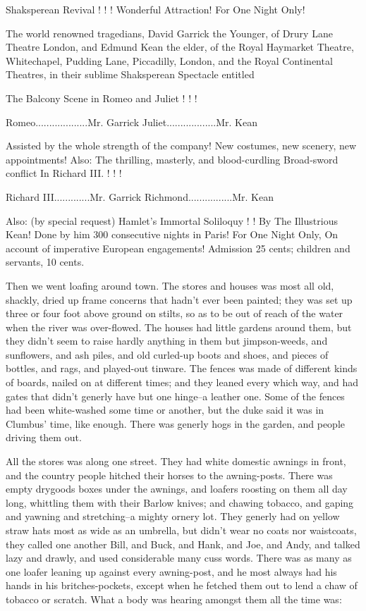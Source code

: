 Shaksperean Revival ! ! !
Wonderful Attraction!
For One Night Only!

The world renowned tragedians, David Garrick the Younger, of Drury Lane
Theatre London, and Edmund Kean the elder, of the Royal Haymarket
Theatre, Whitechapel, Pudding Lane, Piccadilly, London, and the Royal
Continental Theatres, in their sublime Shaksperean Spectacle entitled

The Balcony Scene in Romeo and Juliet ! ! !

Romeo...................Mr. Garrick
Juliet..................Mr. Kean

Assisted by the whole strength of the company!
New costumes, new scenery, new appointments!
Also: The thrilling, masterly, and blood-curdling
Broad-sword conflict In Richard III. ! ! !

Richard III.............Mr. Garrick
Richmond................Mr. Kean

Also: (by special request) Hamlet's Immortal Soliloquy ! !
By The Illustrious Kean! Done by him 300 consecutive nights in Paris!
For One Night Only, On account of imperative European engagements!
Admission 25 cents; children and servants, 10 cents.

Then we went loafing around town.  The stores and houses was most all
old, shackly, dried up frame concerns that hadn't ever been painted; they
was set up three or four foot above ground on stilts, so as to be out of
reach of the water when the river was over-flowed.  The houses had little
gardens around them, but they didn't seem to raise hardly anything in
them but jimpson-weeds, and sunflowers, and ash piles, and old curled-up
boots and shoes, and pieces of bottles, and rags, and played-out tinware.
The fences was made of different kinds of boards, nailed on at different
times; and they leaned every which way, and had gates that didn't generly
have but one hinge--a leather one.  Some of the fences had been
white-washed some time or another, but the duke said it was in Clumbus'
time, like enough.  There was generly hogs in the garden, and people
driving them out.

All the stores was along one street.  They had white domestic awnings in
front, and the country people hitched their horses to the awning-posts.
There was empty drygoods boxes under the awnings, and loafers roosting on
them all day long, whittling them with their Barlow knives; and chawing
tobacco, and gaping and yawning and stretching--a mighty ornery lot.
They generly had on yellow straw hats most as wide as an umbrella, but
didn't wear no coats nor waistcoats, they called one another Bill, and
Buck, and Hank, and Joe, and Andy, and talked lazy and drawly, and used
considerable many cuss words.  There was as many as one loafer leaning up
against every awning-post, and he most always had his hands in his
britches-pockets, except when he fetched them out to lend a chaw of
tobacco or scratch.  What a body was hearing amongst them all the time
was:

